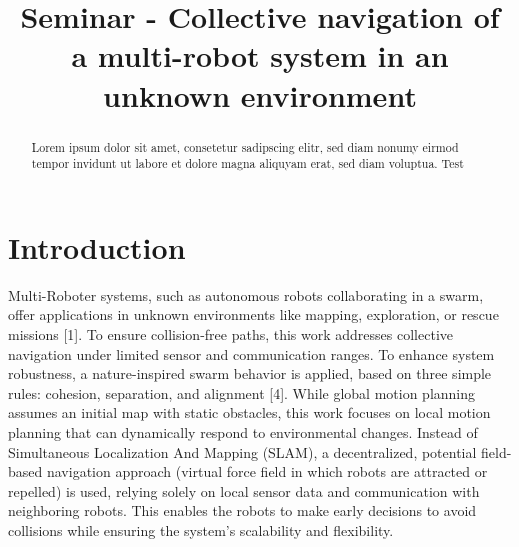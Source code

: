 \documentclass[conference]{IEEEtran}
\begin{document}
\title{Seminar - Collective navigation of a multi-robot system in an unknown environment}
\author{
}

\maketitle


\begin{abstract}
Lorem ipsum dolor sit amet, consetetur sadipscing elitr, sed diam nonumy eirmod tempor invidunt ut labore et dolore magna aliquyam erat, sed diam voluptua.
Test \cite{Olcay.2020}
\end{abstract}

\section{Introduction}
Multi-Roboter systems, such as autonomous robots collaborating in a swarm, offer applications in unknown environments like mapping, exploration, or rescue missions [1]. To ensure collision-free paths, this work addresses collective navigation under limited sensor and communication ranges. To enhance system robustness, a nature-inspired swarm behavior is applied, based on three simple rules: cohesion, separation, and alignment [4]. While global motion planning assumes an initial map with static obstacles, this work focuses on local motion planning that can dynamically respond to environmental changes. Instead of Simultaneous Localization And Mapping (SLAM), a decentralized, potential field-based navigation approach (virtual force field in which robots are attracted or repelled) is used, relying solely on local sensor data and communication with neighboring robots. This enables the robots to make early decisions to avoid collisions while ensuring the system's scalability and flexibility.
\end{document}
